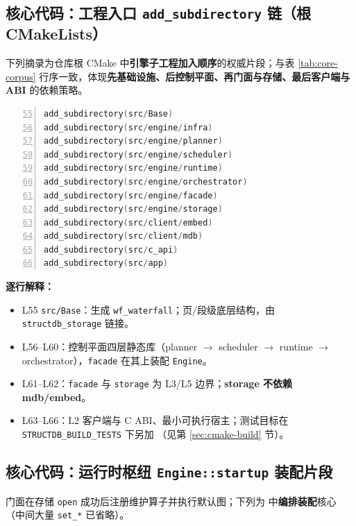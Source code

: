 \subsection{核心代码：工程入口 \texttt{add\_subdirectory} 链（根 CMakeLists）}

下列摘录为仓库根 CMake 中\textbf{引擎子工程加入顺序}的权威片段；与表 \ref{tab:core-corpus} 行序一致，体现\textbf{先基础设施、后控制平面、再门面与存储、最后客户端与 ABI} 的依赖策略。

\begin{lstlisting}[language=C++, numbers=left, firstnumber=55]
add_subdirectory(src/Base)
add_subdirectory(src/engine/infra)
add_subdirectory(src/engine/planner)
add_subdirectory(src/engine/scheduler)
add_subdirectory(src/engine/runtime)
add_subdirectory(src/engine/orchestrator)
add_subdirectory(src/engine/facade)
add_subdirectory(src/engine/storage)
add_subdirectory(src/client/embed)
add_subdirectory(src/client/mdb)
add_subdirectory(src/c_api)
add_subdirectory(src/app)
\end{lstlisting}

\textbf{逐行解释：}
\begin{itemize}
  \item L55 \texttt{src/Base}：生成 \texttt{wf\_waterfall}；页/段级底层结构，由 \texttt{structdb\_storage} 链接。
  \item L56--L60：控制平面四层静态库（planner $\rightarrow$ scheduler $\rightarrow$ runtime $\rightarrow$ orchestrator），\texttt{facade} 在其上装配 \texttt{Engine}。
  \item L61--L62：\texttt{facade} 与 \texttt{storage} 为 L3/L5 边界；\textbf{storage 不依赖 mdb/embed}。
  \item L63--L66：L2 客户端与 C ABI、最小可执行宿主；测试目标在 \texttt{STRUCTDB\_BUILD\_TESTS} 下另加 （见第 \ref{sec:cmake-build} 节）。
\end{itemize}

\subsection{核心代码：运行时枢纽 \texttt{Engine::startup} 装配片段}

门面在存储 \texttt{open} 成功后注册维护算子并执行默认图；下列为  中\textbf{编排装配}核心（中间大量 \texttt{set\_*} 已省略）。

